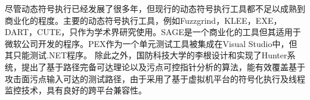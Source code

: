 尽管动态符号执行已经发展了很多年，但现行的动态符号执行工具都不足以成熟到商业化的程度。主要的动态符号执行工具，例如Fuzzgrind，KLEE，EXE，DART，CUTE，只作为学术界研究使用。SAGE是一个商业化的工具但其适用于微软公司开发的程序。PEX作为一个单元测试工具被集成在Visual Studio中，但其只能测试.NET程序。
除此之外，国防科技大学的李根设计和实现了Hunter系统，提出了基于路径完备可达理论以及污点可控指针分析的算法，能有效覆盖基于攻击面污点输入可达的测试路径，由于采用了基于虚拟机平台的符号化执行及线程监控技术，具有良好的跨平台兼容性。
%

